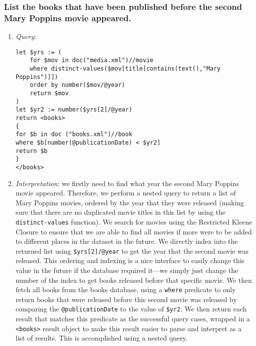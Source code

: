 \documentclass[11pt]{article}
\begin{document}
\subsubsection{List the books that have been published before the second Mary Poppins movie appeared.}

\begin{enumerate}
\item \textit{Query}:
\begin{small}
\begin{verbatim}
let $yrs := (
    for $mov in doc("media.xml")//movie
    where distinct-values($mov[title[contains(text(),"Mary Poppins")]])
    order by number($mov/@year) 
    return $mov
) 
let $yr2 := number($yrs[2]/@year)
return <books>
{
for $b in doc ("books.xml")//book 
where $b[number(@publicationDate) < $yr2] 
return $b
}
</books>
\end{verbatim}
\end{small}
\item \textit{Interpretation}: we firstly need to find what year the second Mary Poppins movie appeared. Therefore, we perform a nested query to return a list of Mary Poppins movies, ordered by the year that they were released (making sure that there are no duplicated movie titles in this list by using the \texttt{distinct-values} function). We search for movies using the Restricted Kleene Closure to ensure that we are able to find all movies if more were to be added to different places in the dataset in the future. We directly index into the returned list using \texttt{\$yrs[2]/@year} to get the year that the second movie was released. This ordering and indexing is a nice interface to easily change this value in the future if the database required it---we simply just change the number of the index to get books released before that specific movie. We then fetch all books from the books database, using a \texttt{where} predicate to only return books that were released before this second movie was released by comparing the \texttt{@publicationDate} to the value of \texttt{\$yr2}. We then return each result that matches this predicate as the successful query cases, wrapped in a \texttt{<books>} result object to make this result easier to parse and interpret as a list of results. This is accomplished using a nested query.


\end{enumerate}
\end{document}
